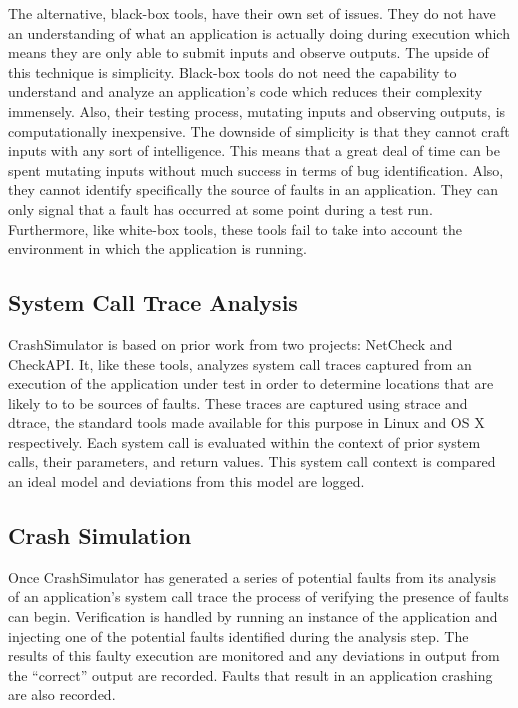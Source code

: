        The alternative, black-box tools, have their own set of issues. They do not have an understanding of what an
        application is actually doing during execution which means they are only able to submit inputs and observe
        outputs.  The upside of this technique is simplicity. Black-box tools do not need the capability to understand
        and analyze an application's code which reduces their complexity immensely. Also, their testing process,
        mutating inputs and observing outputs, is computationally inexpensive. The downside of simplicity is that they
        cannot craft inputs with any sort of intelligence. This means that a great deal of time can be spent mutating
        inputs without much success in terms of bug identification. Also, they cannot identify specifically the source
        of faults in an application. They can only signal that a fault has occurred at some point during a test run.
        Furthermore, like white-box tools, these tools fail to take into account the environment in which the
        application is running.

    \subsection{System Call Trace Analysis}

        CrashSimulator is based on prior work from two projects: NetCheck and CheckAPI. It, like these tools, analyzes
        system call traces captured from an execution of the application under test in order to determine locations that
        are likely to to be sources of faults. These traces are captured using strace and dtrace, the standard tools
        made available for this purpose in Linux and OS X respectively. Each system call is evaluated within the context
        of prior system calls, their parameters, and return values. This system call context is compared an ideal model
        and deviations from this model are logged.

    \subsection{Crash Simulation}

        Once CrashSimulator has generated a series of potential faults from its analysis of an application's system call
        trace the process of verifying the presence of faults can begin. Verification is handled by running an instance
        of the application and injecting one of the potential faults identified during the analysis step.  The results
        of this faulty execution are monitored and any deviations in output from the ``correct'' output are recorded.
        Faults that result in an application crashing are also recorded.


